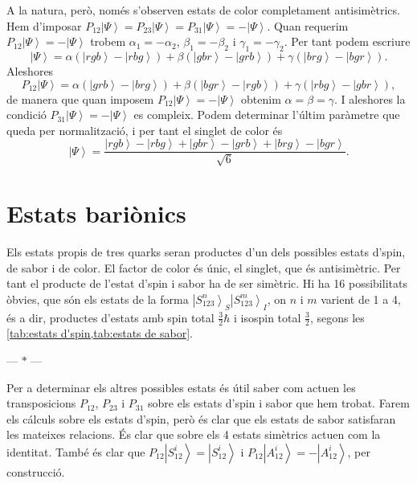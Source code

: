 \documentclass[12pt]{article}
\numberwithin{table}{section}
\numberwithin{figure}{section}
\numberwithin{equation}{section}
\newcommand{\ket}[1]{\left\vert {#1} \right\rangle}
\newcommand{\parbreak}{
	\begin{center}
		--- $\ast$ ---
	\end{center} 
}
\begin{document}
A la natura, però, només s'observen estats de color completament antisimètrics. Hem d'imposar \( P_{12}\ket{\Psi} = P_{23}\ket{\Psi} = P_{31}\ket{\Psi} = -\ket{\Psi} \). Quan requerim \( P_{12}\ket{\Psi} = -\ket{\Psi} \) trobem \( \alpha_1 = -\alpha_2 \), \( \beta_1 = -\beta_2 \) i \( \gamma_1 = -\gamma_2 \). Per tant podem escriure
\begin{equation*}
	\ket{\Psi} = \alpha(\ket{rgb} - \ket{rbg}) + \beta(\ket{gbr} - \ket{grb}) + \gamma(\ket{brg} - \ket{bgr}).
\end{equation*}
Aleshores
\begin{equation*}
	P_{12}\ket{\Psi} = \alpha(\ket{grb} - \ket{brg}) + \beta(\ket{bgr} - \ket{rgb}) + \gamma(\ket{rbg} - \ket{gbr}),
\end{equation*}
de manera que quan imposem \( P_{12}\ket{\Psi} = -\ket{\Psi} \) obtenim \( \alpha = \beta = \gamma \). I aleshores la condició \( P_{31}\ket{\Psi} = -\ket{\Psi} \) es compleix. Podem determinar l'últim paràmetre que queda per normalització, i per tant el singlet de color és 
\begin{equation*}
	\ket{\Psi} = \frac{\ket{rgb} - \ket{rbg} + \ket{gbr} - \ket{grb} + \ket{brg} - \ket{bgr}}{\sqrt{6}}.
\end{equation*}

\section{Estats bariònics}
Els estats propis de tres quarks seran productes d'un dels possibles estats d'spin, de sabor i de color. El factor de color és únic, el singlet, que és antisimètric. Per tant el producte de l'estat d'spin i sabor ha de ser simètric. Hi ha 16 possibilitats òbvies, que són els estats de la forma \( \ket{S_{123}^n}_S\ket{S_{123}^m}_I \), on \( n \) i \( m \) varient de 1 a 4, és a dir, productes d'estats amb spin total \( \frac{3}{2}\hbar \) i isospin total \( \frac{3}{2} \), segons les \cref{tab:estats d'spin,tab:estats de sabor}.

\parbreak

Per a determinar els altres possibles estats és útil saber com actuen les transposicions \( P_{12} \), \( P_{23} \) i \( P_{31} \) sobre els estats d'spin i sabor que hem trobat. Farem els cálculs sobre els estats d'spin, però és clar que els estats de sabor satisfaran les mateixes relacions. És clar que sobre els 4 estats simètrics actuen com la identitat. També és clar que \( P_{12}\ket{S_{12}^i} = \ket{S_{12}^i} \) i \( P_{12}\ket{A_{12}^i} = -\ket{A_{12}^i} \), per construcció.
\end{document}
